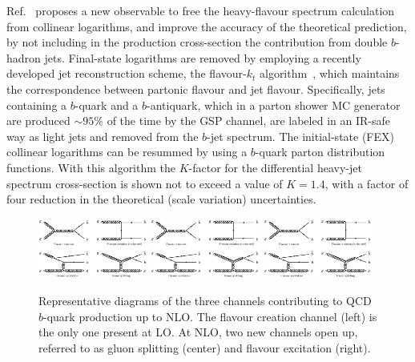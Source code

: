 Ref.~\cite{Salam.AccurateHQ} proposes a new observable to free the heavy-flavour spectrum calculation from collinear logarithms, and improve the accuracy of the theoretical prediction,
by not including in the production cross-section the contribution from double $b$-hadron jets. Final-state logarithms are removed by employing a recently developed jet reconstruction scheme, the flavour-$k_t$ algorithm~\cite{flavorkt}, which maintains the correspondence between partonic flavour and jet flavour. Specifically, jets containing a $b$-quark and a $b$-antiquark, which in a parton shower MC generator are produced $\sim95\%$ of the time by the GSP channel, are labeled in an IR-safe way as light jets and removed from the $b$-jet spectrum.
The initial-state (FEX) collinear logarithms can be resummed by using a $b$-quark parton distribution functions.
With this algorithm the $K$-factor for the differential heavy-jet spectrum cross-section is shown not to exceed a value of $K=1.4$, with a factor of four reduction in the theoretical (scale variation) uncertainties.
%
\begin{figure}[h!]
\centering
\includegraphics[width=0.32\textwidth,viewport=0 880 1500 1600,clip]{FIGS/bb_diagrams.jpg}
\includegraphics[width=0.32\textwidth,viewport=1600 0 3100 820,clip]{FIGS/bb_diagrams.jpg}
\includegraphics[width=0.32\textwidth,viewport=0 0 1500 820,clip]{FIGS/bb_diagrams.jpg}
\caption{Representative diagrams of the three channels contributing to QCD $b$-quark production up to NLO. The flavour creation channel (left) is the only one present at LO. At NLO, two new channels open up, referred to as gluon splitting (center) and  flavour excitation (right).}
\label{fig:qcd_diagrams}
\end{figure}
%


